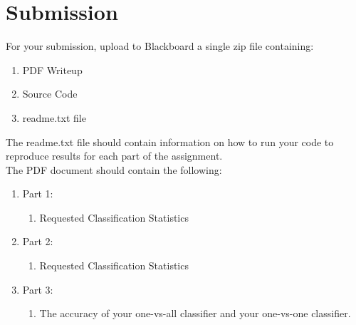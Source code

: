 \documentclass[12pt]{article}
\begin{document}
\newpage
\section*{Submission}
For your submission, upload to Blackboard a single zip file containing:

\begin{enumerate}
\item PDF Writeup
\item Source Code
\item readme.txt file
\end{enumerate}

\noindent
The readme.txt file should contain information on how to run your code to reproduce results for each part of the assignment.\\

\noindent
The PDF document should contain the following:

\begin{enumerate}
\item Part 1:
	\begin{enumerate}
	\item Requested Classification Statistics
	\end{enumerate}
\item Part 2:
	\begin{enumerate}
	\item Requested Classification Statistics
	\end{enumerate}
\item Part 3:
	\begin{enumerate}
	\item The accuracy of your one-vs-all classifier and your one-vs-one classifier.
	\end{enumerate}
\end{enumerate}
\end{document}
